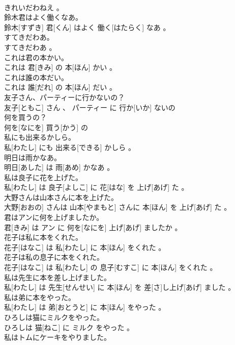 \documentclass[8pt]{extreport}
\begin{document}
\begin{CJK}{UTF8}{min}
\\	きれいだわねえ 。
\\	鈴木君はよく働くなあ。	
\\	鈴木[すずき] 君[くん] はよく 働く[はたらく] なあ 。
\\	すてきだわあ。	
\\	すてきだわあ 。
\\	これは君の本かい。	
\\	これは 君[きみ] の 本[ほん] かい 。
\\	これは誰の本だい。	
\\	これは 誰[だれ] の 本[ほん] だい 。
\\	友子さん、パーティーに行かないの？	
\\	友子[ともこ] さん 、 パーティー に 行か[いか] ないの 
\\	何を買うの？	
\\	何を[なにを] 買う[かう] の 
\\	私にも出来るかしら。	
\\	私[わたし] にも 出来る[できる] かしら 。
\\	明日は雨かなあ。	
\\	明日[あした] は 雨[あめ] かなあ 。
\\	私は良子に花を上げた。	
\\	私[わたし] は 良子[よしこ] に 花[はな] を 上げ[あげ] た 。
\\	大野さんは山本さんに本を上げた。	
\\	大野[おおの] さんは 山本[やまもと] さんに 本[ほん] を 上げ[あげ] た 。
\\	君はアンに何を上げましたか。	
\\	君[きみ] は アン に 何を[なにを] 上げ[あげ] ましたか 。
\\	花子は私に本をくれた。	
\\	花子[はなこ] は 私[わたし] に 本[ほん] をくれた 。
\\	花子は私の息子に本をくれた。	
\\	花子[はなこ] は 私[わたし] の 息子[むすこ] に 本[ほん] をくれた 。
\\	私は先生に本を差し上げました。	
\\	私[わたし] は 先生[せんせい] に 本[ほん] を 差[さ]し上げ[あげ] ました 。
\\	私は弟に本をやった。	
\\	私[わたし] は 弟[おとうと] に 本[ほん] をやった 。
\\	ひろしは猫にミルクをやった。	
\\	ひろしは 猫[ねこ] に ミルク をやった 。
\\	私はトムにケーキをやりました。	

\end{CJK}
\end{document}
